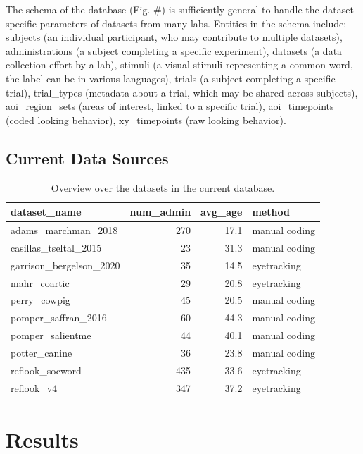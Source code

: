 \documentclass[10pt, letterpaper]{article}
\begin{document}
The schema of the database (Fig. \#) is sufficiently general to handle
the dataset-specific parameters of datasets from many labs. Entities in
the schema include: subjects (an individual participant, who may
contribute to multiple datasets), administrations (a subject completing
a specific experiment), datasets (a data collection effort by a lab),
stimuli (a visual stimuli representing a common word, the label can be
in various languages), trials (a subject completing a specific trial),
trial\_types (metadata about a trial, which may be shared across
subjects), aoi\_region\_sets (areas of interest, linked to a specific
trial), aoi\_timepoints (coded looking behavior), xy\_timepoints (raw
looking behavior).

\hypertarget{current-data-sources}{%
\subsection{Current Data Sources}\label{current-data-sources}}

\begin{table}[H]
\centering
\begingroup\fontsize{9pt}{10pt}\selectfont
\begin{tabular}{lrrl}
  \hline
dataset\_name & num\_admin & avg\_age & method \\ 
  \hline
adams\_marchman\_2018 & 270 & 17.1 & manual coding \\ 
  casillas\_tseltal\_2015 & 23 & 31.3 & manual coding \\ 
  garrison\_bergelson\_2020 & 35 & 14.5 & eyetracking \\ 
  mahr\_coartic & 29 & 20.8 & eyetracking \\ 
  perry\_cowpig & 45 & 20.5 & manual coding \\ 
  pomper\_saffran\_2016 & 60 & 44.3 & manual coding \\ 
  pomper\_salientme & 44 & 40.1 & manual coding \\ 
  potter\_canine & 36 & 23.8 & manual coding \\ 
  reflook\_socword & 435 & 33.6 & eyetracking \\ 
  reflook\_v4 & 347 & 37.2 & eyetracking \\ 
   \hline
\end{tabular}
\endgroup
\caption{Overview over the datasets in the current database.} 
\end{table}

\hypertarget{results}{%
\section{Results}\label{results}}
\end{document}
